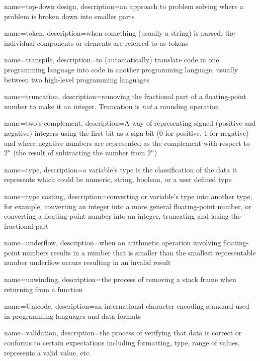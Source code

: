 {
  name=top-down design,
  description={an approach to problem solving where a problem is broken down into smaller parts}
}

{
  name=token,
  description={when something (usually a string) is parsed, the individual components or elements are referred to as tokens}
}

{
  name=transpile,
  description={to (automatically) translate code in one programming language into code in another programming language, usually between two high-level programming languages}
}

{
  name=truncation,
  description={removing the fractional part of a floating-point number to make it an integer.  Truncation is \emph{not} a 
  	rounding operation}
}

{
  name=two's complement,
  description={A way of representing signed (positive and negative) integers using the first bit as a sign bit (0 for positive, 1 for negative) and where negative numbers are represented as the complement with respect to $2^n$ (the result of subtracting the number from $2^n$) }
}

{
  name=type,
  description={a variable's type is the classification of the data it represents which could be numeric, string, boolean, or
  	a user defined type}
}

{
  name=type casting,
  description={converting or variable's type into another type, for example, converting an integer into a more general floating-point number, or
  	converting a floating-point number into an integer, truncating and losing the fractional part}
}

{
  name=underflow,
  description={when an arithmetic operation involving floating-point numbers results in a number that is smaller than the smallest representable
  number underflow occurs resulting in an invalid result}
}

{
  name=unwinding,
  description={the process of removing a stack frame when returning from a function}
}

{
  name=Unicode,
  description={an international character encoding standard used in programming languages and data formats}
}

{
  name=validation,
  description={the process of verifying that data is correct or conforms to certain expectations including formatting, type, range of values,
  	represents a valid value, etc.}
}

